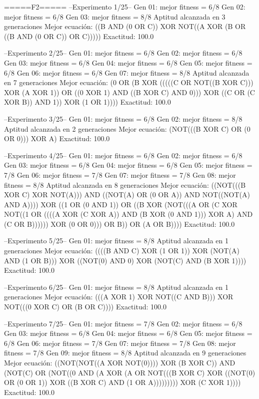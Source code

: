 =====F2=====
--Experimento 
 1/25--
Gen 01: mejor fitness = 6/8
Gen 02: mejor fitness = 6/8
Gen 03: mejor fitness = 8/8
Aptitud alcanzada en 3 generaciones
Mejor ecuación: ((B AND (0 OR C)) XOR NOT((A XOR (B OR ((B AND (0 OR C)) OR C)))))
 Exactitud: 100.0%

--Experimento 
 2/25--
Gen 01: mejor fitness = 6/8
Gen 02: mejor fitness = 6/8
Gen 03: mejor fitness = 6/8
Gen 04: mejor fitness = 6/8
Gen 05: mejor fitness = 6/8
Gen 06: mejor fitness = 6/8
Gen 07: mejor fitness = 8/8
Aptitud alcanzada en 7 generaciones
Mejor ecuación: (0 OR (B XOR (((((C OR NOT((B XOR C))) XOR (A XOR 1)) OR ((0 XOR 1) AND ((B XOR C) AND 0))) XOR ((C OR (C XOR B)) AND 1)) XOR (1 OR 1))))
 Exactitud: 100.0%

--Experimento 
 3/25--
Gen 01: mejor fitness = 6/8
Gen 02: mejor fitness = 8/8
Aptitud alcanzada en 2 generaciones
Mejor ecuación: (NOT(((B XOR C) OR (0 OR 0))) XOR A)
 Exactitud: 100.0%

--Experimento 
 4/25--
Gen 01: mejor fitness = 6/8
Gen 02: mejor fitness = 6/8
Gen 03: mejor fitness = 6/8
Gen 04: mejor fitness = 6/8
Gen 05: mejor fitness = 7/8
Gen 06: mejor fitness = 7/8
Gen 07: mejor fitness = 7/8
Gen 08: mejor fitness = 8/8
Aptitud alcanzada en 8 generaciones
Mejor ecuación: ((NOT(((B XOR C) XOR NOT(A))) AND ((NOT(A) OR (0 OR A)) AND NOT((NOT(A) AND A)))) XOR ((1 OR (0 AND 1)) OR ((B XOR (NOT(((A OR (C XOR NOT((1 OR ((((A XOR (C XOR A)) AND (B XOR (0 AND 1))) XOR A) AND (C OR B)))))) XOR (0 OR 0))) OR B)) OR (A OR B))))
 Exactitud: 100.0%

--Experimento 
 5/25--
Gen 01: mejor fitness = 8/8
Aptitud alcanzada en 1 generaciones
Mejor ecuación: ((((B AND C) XOR (1 OR 1)) XOR (NOT(A) AND (1 OR B))) XOR ((NOT(0) AND 0) XOR (NOT(C) AND (B XOR 1))))
 Exactitud: 100.0%

--Experimento 
 6/25--
Gen 01: mejor fitness = 8/8
Aptitud alcanzada en 1 generaciones
Mejor ecuación: (((A XOR 1) XOR NOT((C AND B))) XOR NOT(((0 XOR C) OR (B OR C))))
 Exactitud: 100.0%

--Experimento 
 7/25--
Gen 01: mejor fitness = 7/8
Gen 02: mejor fitness = 6/8
Gen 03: mejor fitness = 6/8
Gen 04: mejor fitness = 6/8
Gen 05: mejor fitness = 6/8
Gen 06: mejor fitness = 7/8
Gen 07: mejor fitness = 7/8
Gen 08: mejor fitness = 7/8
Gen 09: mejor fitness = 8/8
Aptitud alcanzada en 9 generaciones
Mejor ecuación: ((NOT(NOT((A XOR NOT(0)))) XOR (B XOR C)) AND (NOT(C) OR (NOT((0 AND (A XOR (A OR NOT(((B XOR C) XOR ((NOT(0) OR (0 OR 1)) XOR ((B XOR C) AND (1 OR A))))))))) XOR (C XOR 1))))
 Exactitud: 100.0%

